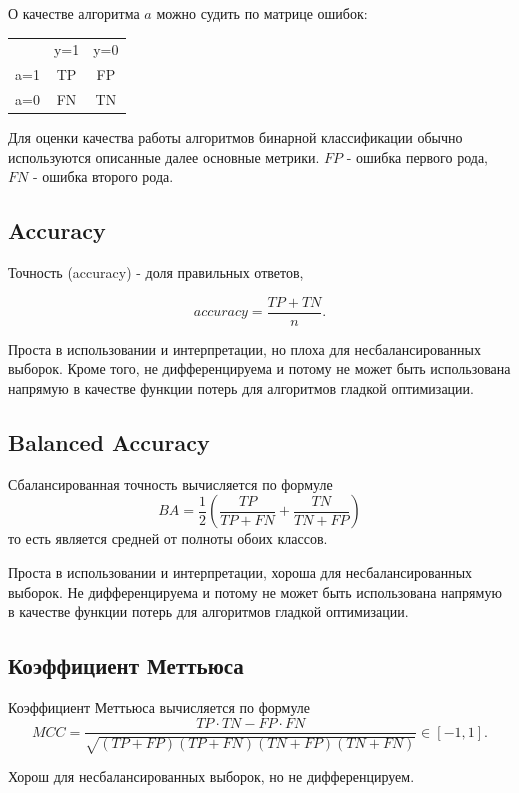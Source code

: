 О качестве алгоритма $a$ можно судить по матрице ошибок:
\begin{center}
\begin{tabular}{ c c c }
     & y=1 & y=0 \\ 
 a=1 & TP  & FP \\  
 a=0 & FN  & TN    
\end{tabular}
\end{center}

Для оценки качества работы алгоритмов бинарной классификации обычно используются описанные далее основные метрики. $FP$ - ошибка первого рода, $FN$ - ошибка второго рода.

\subsection{Accuracy}

Точность (accuracy) - доля правильных ответов,

$$
accuracy = \frac{TP + TN}{n}.
$$

Проста в использовании и интерпретации, но плоха для несбалансированных выборок. Кроме того, не дифференцируема и потому не может быть использована напрямую в качестве функции потерь для алгоритмов гладкой оптимизации.

\subsection{Balanced Accuracy}

Сбалансированная точность вычисляется по формуле
$$
BA = \frac{1}{2}\left(\frac{TP}{TP + FN} + \frac{TN}{TN + FP}\right)
$$
то есть является средней от полноты обоих классов.

Проста в использовании и интерпретации, хороша для несбалансированных выборок. Не дифференцируема и потому не может быть использована напрямую в качестве функции потерь для алгоритмов гладкой оптимизации.

\subsection{Коэффициент Меттьюса}

Коэффициент Меттьюса вычисляется по формуле
$$
MCC = \frac{TP\cdot TN - FP\cdot FN}{\sqrt{(TP+FP)(TP+FN)(TN+FP)(TN+FN)}} \in [-1, 1].
$$

Хорош для несбалансированных выборок, но не дифференцируем.



